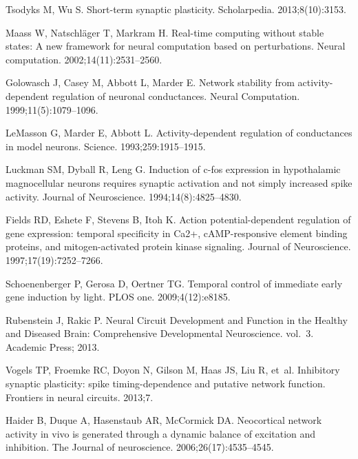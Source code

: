 \documentclass[10pt,letterpaper]{article}
\begin{document}
\begin{thebibliography}{10}
Tsodyks M, Wu S.
\newblock Short-term synaptic plasticity.
\newblock Scholarpedia. 2013;8(10):3153.

Maass W, Natschl{\"a}ger T, Markram H.
\newblock Real-time computing without stable states: A new framework for neural
  computation based on perturbations.
\newblock Neural computation. 2002;14(11):2531--2560.

Golowasch J, Casey M, Abbott L, Marder E.
\newblock Network stability from activity-dependent regulation of neuronal
  conductances.
\newblock Neural Computation. 1999;11(5):1079--1096.

LeMasson G, Marder E, Abbott L.
\newblock Activity-dependent regulation of conductances in model neurons.
\newblock Science. 1993;259:1915--1915.

Luckman SM, Dyball R, Leng G.
\newblock Induction of c-fos expression in hypothalamic magnocellular neurons
  requires synaptic activation and not simply increased spike activity.
\newblock Journal of Neuroscience. 1994;14(8):4825--4830.

Fields RD, Eshete F, Stevens B, Itoh K.
\newblock Action potential-dependent regulation of gene expression: temporal
  specificity in Ca2+, cAMP-responsive element binding proteins, and
  mitogen-activated protein kinase signaling.
\newblock Journal of Neuroscience. 1997;17(19):7252--7266.

Schoenenberger P, Gerosa D, Oertner TG.
\newblock Temporal control of immediate early gene induction by light.
\newblock PLOS one. 2009;4(12):e8185.

Rubenstein J, Rakic P.
\newblock Neural Circuit Development and Function in the Healthy and Diseased
  Brain: Comprehensive Developmental Neuroscience. vol.~3.
\newblock Academic Press; 2013.

Vogels TP, Froemke RC, Doyon N, Gilson M, Haas JS, Liu R, et~al.
\newblock Inhibitory synaptic plasticity: spike timing-dependence and putative
  network function.
\newblock Frontiers in neural circuits. 2013;7.

Haider B, Duque A, Hasenstaub AR, McCormick DA.
\newblock Neocortical network activity in vivo is generated through a dynamic
  balance of excitation and inhibition.
\newblock The Journal of neuroscience. 2006;26(17):4535--4545.


\end{thebibliography}
\end{document}
